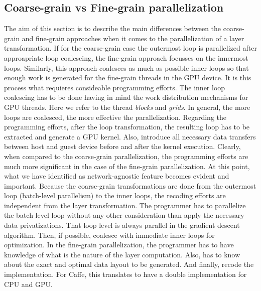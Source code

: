 \subsection{Coarse-grain vs Fine-grain parallelization}
The aim of this section is to describe the main differences between 
the coarse-grain and fine-grain approaches when it comes to the 
parallelization of a layer transformation. If for the coarse-grain 
case the outermost loop is parallelized after approapriate loop 
coalescing, the fine-grain approach focusses on the innermost loops.
Similarly, this approach coalesces as much as possible inner loops 
so that enough work is generated for the fine-grain threads in 
the GPU device. It is this process what requieres consideable programming 
efforts. The inner loop coalescing has to be done having in mind the 
work distribution mechanisms for GPU threads. Here we refer to the 
thread \emph{blocks} and \emph{grids}. In general, the more loops 
are coalesced, the more effective the parallelization. Regarding the 
programming efforts, after the loop transformation, the resulting loop 
has to be extracted and generate a GPU kernel. Also, introduce all 
necessary data transfers between host and guest device before and after 
the kernel execution. Clearly, when compared to the coarse-grain 
parallelization, the programming efforts are much more significant in 
the case of the fine-grain parallelization. At this point, what we 
have identified as network-agnostic feature becomes evident and 
important. Because the coarse-grain transformations are done from 
the outermost loop (batch-level parallelism) to the inner loops, 
the recoding efforts are independent from the layer transformation. 
The programmer has to parallelize the batch-level loop without any 
other consideration than apply the necessary data privatizations. 
That loop level is always parallel in the gradient descent algorithm. 
Then, if possible, coalesce with immediate inner loops for 
optimization. In the fine-grain parallelization, the programmer has to 
have knowledge of what is the nature of the layer computation. Also, 
has to know about the exact and optimal data layout to be generated. 
And finally, recode the implementation. For Caffe, this translates to
have a double implementation for CPU and GPU.


